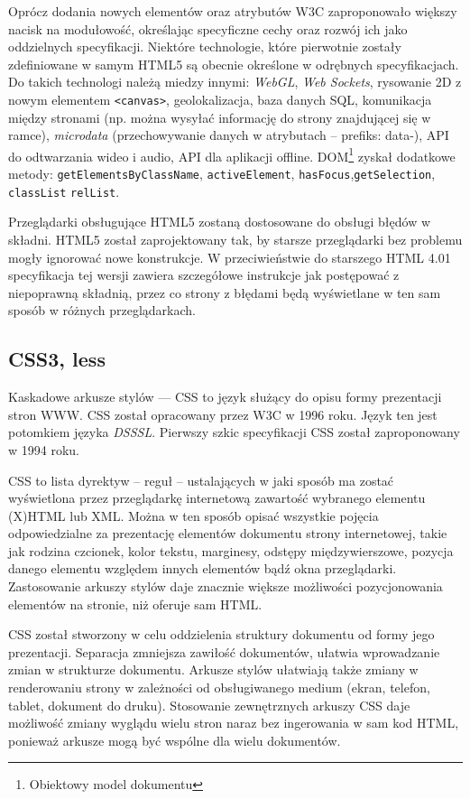 Oprócz dodania nowych elementów oraz atrybutów W3C zaproponowało większy nacisk na modułowość, określając specyficzne cechy oraz rozwój ich jako oddzielnych specyfikacji. Niektóre technologie, które pierwotnie zostały zdefiniowane w samym HTML5 są obecnie określone w odrębnych specyfikacjach. Do takich technologi należą miedzy innymi: \emph{WebGL}, \emph{Web Sockets}, rysowanie 2D z nowym elementem \verb|<canvas>|, geolokalizacja, baza danych SQL, komunikacja między stronami (np. można wysyłać informację do strony znajdującej się w ramce), \emph{microdata} (przechowywanie danych w atrybutach -- prefiks: data-), API do odtwarzania wideo i audio, API dla aplikacji offline. DOM\footnote{Obiektowy model dokumentu} zyskał dodatkowe metody: \verb|getElementsByClassName|, \verb|activeElement|, \verb|hasFocus|,\verb|getSelection|, \verb|classList| \verb|relList|\cite{htmlWiki}.

Przeglądarki obsługujące HTML5 zostaną dostosowane do obsługi błędów w składni. HTML5 został zaprojektowany tak, by starsze przeglądarki bez problemu mogły ignorować nowe konstrukcje. W przeciwieństwie do starszego HTML 4.01 specyfikacja tej wersji zawiera szczegółowe instrukcje jak postępować z niepoprawną składnią, przez co strony z błędami będą wyświetlane w ten sam sposób w różnych przeglądarkach.

\subsection{CSS3, less}
Kaskadowe arkusze stylów --- CSS to język służący do opisu formy prezentacji stron WWW. CSS został opracowany przez W3C w 1996 roku. Język ten jest potomkiem języka \emph{DSSSL}. Pierwszy szkic specyfikacji CSS został zaproponowany w 1994 roku. 

CSS to lista dyrektyw -- reguł -- ustalających w jaki sposób ma zostać wyświetlona przez przeglądarkę internetową zawartość wybranego elementu (X)HTML lub XML. Można w ten sposób opisać wszystkie pojęcia odpowiedzialne za prezentację elementów dokumentu strony internetowej, takie jak rodzina czcionek, kolor tekstu, marginesy, odstępy międzywierszowe, pozycja danego elementu względem innych elementów bądź okna przeglądarki. Zastosowanie arkuszy stylów daje znacznie większe możliwości pozycjonowania elementów na stronie, niż oferuje sam HTML\cite{cssWiki}. 

CSS został stworzony w celu oddzielenia struktury dokumentu od formy jego prezentacji. Separacja zmniejsza zawiłość dokumentów, ułatwia wprowadzanie zmian w strukturze dokumentu. Arkusze stylów ułatwiają także zmiany w renderowaniu strony w zależności od obsługiwanego medium (ekran, telefon, tablet, dokument do druku). Stosowanie zewnętrznych arkuszy CSS daje możliwość zmiany wyglądu wielu stron naraz bez ingerowania w sam kod HTML, ponieważ arkusze mogą być wspólne dla wielu dokumentów. 

